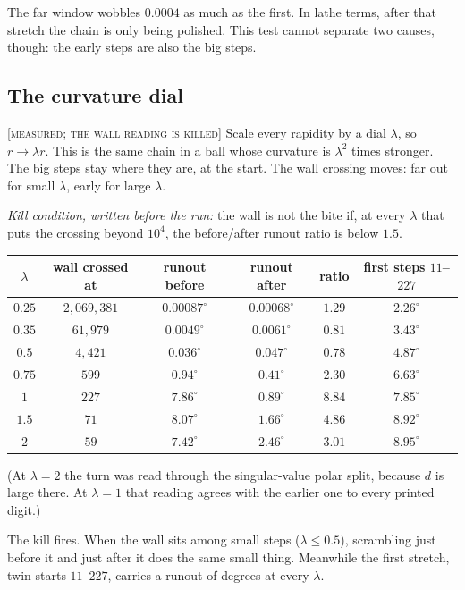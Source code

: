 \documentclass[11pt]{article}
\theoremstyle{definition}
\theoremstyle{remark}
\newcommand{\grade}[1]{\textsc{[#1]}}
\begin{document}
The far window wobbles $0.0004$ as much as the first. In lathe terms, after that stretch the chain is only being polished. This test cannot separate two causes, though: the early steps are also the big steps.

\subsection{The curvature dial} \grade{measured; the wall reading is killed}
Scale every rapidity by a dial $\lambda$, so $r\to\lambda r$. This is the same chain in a ball whose curvature is $\lambda^2$ times stronger. The big steps stay where they are, at the start. The wall crossing moves: far out for small $\lambda$, early for large $\lambda$.

\emph{Kill condition, written before the run:} the wall is not the bite if, at every $\lambda$ that puts the crossing beyond $10^4$, the before/after runout ratio is below $1.5$.

\begin{center}\begin{tabular}{cccccc}
\toprule
$\lambda$ & wall crossed at & runout before & runout after & ratio & first steps $11$--$227$\\
\midrule
$0.25$ & $2{,}069{,}381$ & $0.00087^\circ$ & $0.00068^\circ$ & $1.29$ & $2.26^\circ$\\
$0.35$ & $61{,}979$ & $0.0049^\circ$ & $0.0061^\circ$ & $0.81$ & $3.43^\circ$\\
$0.5$ & $4{,}421$ & $0.036^\circ$ & $0.047^\circ$ & $0.78$ & $4.87^\circ$\\
$0.75$ & $599$ & $0.94^\circ$ & $0.41^\circ$ & $2.30$ & $6.63^\circ$\\
$1$ & $227$ & $7.86^\circ$ & $0.89^\circ$ & $8.84$ & $7.85^\circ$\\
$1.5$ & $71$ & $8.07^\circ$ & $1.66^\circ$ & $4.86$ & $8.92^\circ$\\
$2$ & $59$ & $7.42^\circ$ & $2.46^\circ$ & $3.01$ & $8.95^\circ$\\
\bottomrule
\end{tabular}\end{center}
(At $\lambda=2$ the turn was read through the singular-value polar split, because $d$ is large there. At $\lambda=1$ that reading agrees with the earlier one to every printed digit.)

The kill fires. When the wall sits among small steps ($\lambda\le0.5$), scrambling just before it and just after it does the same small thing. Meanwhile the first stretch, twin starts $11$--$227$, carries a runout of degrees at every $\lambda$.
\end{document}
